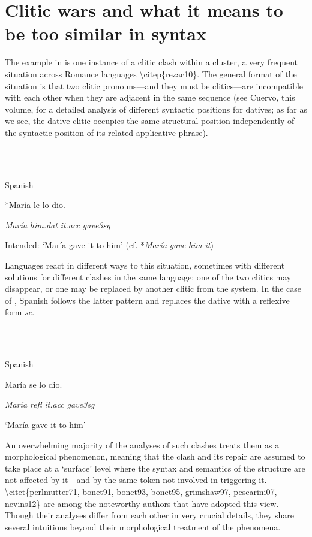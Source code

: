 \documentclass[output=paper,modfonts,nonflat]{langsci/langscibook}
\begin{document}
\section{Clitic wars and what it means to be too similar in syntax} %

The example in  is one instance of a clitic clash within a cluster, a very frequent situation across Romance languages {\textbackslash}citep\{rezac10\}. The general format of the situation is that two clitic pronouns—and they must be clitics—are incompatible with each other when they are adjacent in the same sequence (see Cuervo, this volume, for a detailed analysis of different syntactic positions for datives; as far as we see, the dative clitic occupies the same structural position independently of the syntactic position of its related applicative phrase). 

\ea%
    \label{ex:key:1}
    \gll\\
        \\
    \glt
    \z

          Spanish

    *María   le     lo   dio.       

      \textit{María}   \textit{him.dat}  \textit{it.acc}  \textit{gave3sg}

    Intended: ‘María gave it to him’ (cf. *\textit{María} \textit{gave} \textit{him} \textit{it})  

Languages react in different ways to this situation, sometimes with different solutions for different clashes in the same language: one of the two clitics may disappear, or one may be replaced by another clitic from the system. In the case of , Spanish follows the latter pattern and replaces the dative with a reflexive form \textit{se}.

\ea%
    \label{ex:key:2}
    \gll\\
        \\
    \glt
    \z

          Spanish

    María  se  lo    dio.

    \textit{María}  \textit{refl}  \textit{it.acc}  \textit{gave3sg}

    ‘María gave it to him’

 An overwhelming majority of the analyses of such clashes treats them as a morphological phenomenon, meaning that the clash and its repair are assumed to take place at a ‘surface’ level where the syntax and semantics of the structure are not affected by it—and by the same token not involved in triggering it. {\textbackslash}citet\{perlmutter71, bonet91, bonet93, bonet95, grimshaw97, pescarini07, nevins12\} are among the noteworthy authors that have adopted this view. Though their analyses differ from each other in very crucial details, they share several intuitions beyond their morphological treatment of the phenomena. 
\end{document}
